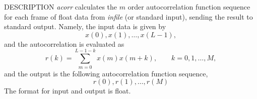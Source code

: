 % 
% 
% 
% 
%                                                                        
%

\begin{synopsis}
 \item[ acorr ] [ --m $M$ ] [ --l $L$ ] [ {\em infile} ]
\end{synopsis}

\begin{qsection}{DESCRIPTION}
{\em acorr} calculates the $m$ order autocorrelation function sequence 
for each frame of float data from {\em infile} (or standard input), 
sending the result to standard output.
Namely, the input data is given by
\[ x(0),x(1),\dots,x(L-1), \]
 and the autocorrelation is evaluated as
\[ r(k)=\sum_{m=0}^{L-1-k}x(m)x(m+k), \qquad k=0,1,\dots,M, \]
 and the output is the following autocorrelation function sequence,
\[ r(0),r(1),\dots,r(M) \]
 The format for input and output is float.
\end{qsection}


